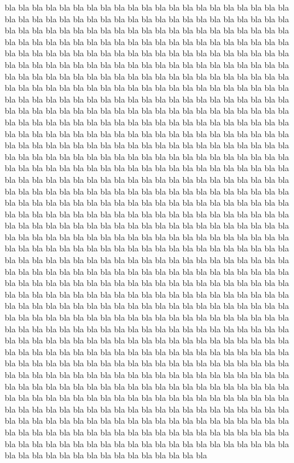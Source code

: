 \documentclass[12pt]{book}%
\theoremstyle{definition}%
\begin{document}
bla bla bla bla bla bla bla bla bla bla bla bla bla bla bla bla bla bla bla bla bla bla bla bla bla bla bla bla bla bla bla bla bla bla bla bla bla bla bla bla bla bla bla bla bla bla bla bla bla bla bla bla bla bla bla bla bla bla bla bla bla bla bla bla bla bla bla bla bla bla bla bla bla bla bla bla bla bla bla bla bla bla bla bla bla bla bla bla bla bla bla bla bla bla bla bla bla bla bla bla bla bla bla bla bla bla bla bla bla bla bla bla bla bla bla bla bla bla bla bla bla bla bla bla bla bla bla bla bla bla bla bla bla bla bla bla bla bla bla bla bla bla bla bla bla bla bla bla bla bla bla bla bla bla bla bla bla bla bla bla bla bla bla bla bla bla bla bla bla bla bla bla bla bla bla bla bla bla bla bla bla bla bla bla bla bla bla bla bla bla bla bla bla bla bla bla bla bla bla bla bla bla bla bla bla bla bla bla bla bla bla bla bla bla bla bla bla bla bla bla bla bla bla bla bla bla bla bla bla bla bla bla bla bla bla bla bla bla bla bla bla bla bla bla bla bla bla bla bla bla bla bla bla bla bla bla bla bla bla bla bla bla bla bla bla bla bla bla bla bla bla bla bla bla bla bla bla bla bla bla bla bla bla bla bla bla bla bla bla bla bla bla bla bla bla bla bla bla bla bla bla bla bla bla bla bla bla bla bla bla bla bla bla bla bla bla bla bla bla bla bla bla bla bla bla bla bla bla bla bla bla bla bla bla bla bla bla bla bla bla bla bla bla bla bla bla bla bla bla bla bla bla bla bla bla bla bla bla bla bla bla bla bla bla bla bla bla bla bla bla bla bla bla bla bla bla bla bla bla bla bla bla bla bla bla bla bla bla bla bla bla bla bla bla bla bla bla bla bla bla bla bla bla bla bla bla bla bla bla bla bla bla bla bla bla bla bla bla bla bla bla bla bla bla bla bla bla bla bla bla bla bla bla bla bla bla bla bla bla bla bla bla bla bla bla bla bla bla bla bla bla bla bla bla bla bla bla bla bla bla bla bla bla bla bla bla bla bla bla bla bla bla bla bla bla bla bla bla bla bla bla bla bla bla bla bla bla bla bla bla bla bla bla bla bla bla bla bla bla bla bla bla bla bla bla bla bla bla bla bla bla bla bla bla bla bla bla bla bla bla bla bla bla bla bla bla bla bla bla bla bla bla bla bla bla bla bla bla bla bla bla bla bla bla bla bla bla bla bla bla bla bla bla bla bla bla bla bla bla bla bla bla bla bla bla bla bla bla bla bla bla bla bla bla bla bla bla bla bla bla bla bla bla bla bla bla bla bla bla bla bla bla bla bla bla bla bla bla bla bla bla bla bla bla bla bla bla bla bla bla bla bla bla bla bla bla bla bla bla bla bla bla bla bla bla bla bla bla bla bla bla bla bla bla bla bla bla bla bla bla bla bla bla bla bla bla bla bla bla bla bla bla bla bla bla bla bla bla bla bla bla bla bla bla bla bla bla bla bla bla bla bla bla bla bla bla bla bla bla bla bla bla bla bla bla bla bla bla bla bla bla bla bla bla bla bla bla bla bla bla bla bla bla bla bla bla bla bla bla bla bla bla bla bla bla bla bla bla bla bla bla bla bla bla bla bla bla bla bla bla bla bla bla bla bla bla bla bla bla bla bla bla bla bla bla bla bla bla bla bla bla bla bla bla bla bla bla bla bla bla bla bla bla bla bla bla bla bla bla bla bla bla bla bla bla bla bla bla bla bla bla bla bla bla bla bla bla bla bla bla bla bla bla bla bla bla bla bla bla bla bla bla bla bla bla bla bla bla bla bla bla bla bla bla bla bla bla bla bla bla bla bla bla bla bla bla bla bla bla bla bla bla bla bla 
\end{document}
